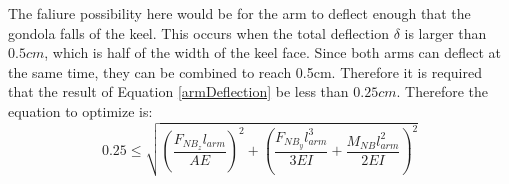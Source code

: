 \documentclass[../main.tex]{subfiles}
\begin{document}
The faliure possibility here would be for the arm to deflect enough that the gondola falls of the keel. This occurs when the total deflection $\delta$ is larger than $0.5cm$, which is half of the width of the keel face. Since both arms can deflect at the same time, they can be combined to reach 0.5cm. Therefore it is required that the result of Equation \ref{armDeflection} be less than $0.25cm$. Therefore the equation to optimize is:
\begin{equation}
	0.25 \leq \sqrt{\left(\dfrac{F_{NB_{z}}l_{arm}}{AE}\right)^2 + \left(\dfrac{F_{NB_{y}}l_{arm}^3}{3EI}  + \dfrac{M_{NB}l_{arm}^2}{2EI} \right)^2}
\end{equation}
\end{document}
